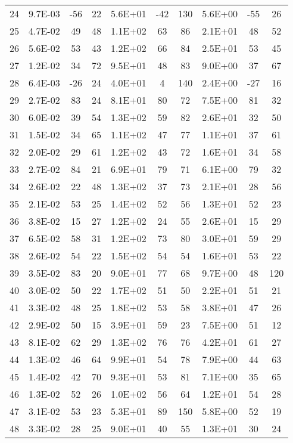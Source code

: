 \begin{tabular}{cccccccccc}
24 & 9.7E-03 & -56 & 22 & 5.6E+01 & -42 & 130 & 5.6E+00 & -55 & 26 \\
25 & 4.7E-02 & 49 & 48 & 1.1E+02 & 63 & 86 & 2.1E+01 & 48 & 52 \\
26 & 5.6E-02 & 53 & 43 & 1.2E+02 & 66 & 84 & 2.5E+01 & 53 & 45 \\
27 & 1.2E-02 & 34 & 72 & 9.5E+01 & 48 & 83 & 9.0E+00 & 37 & 67 \\
28 & 6.4E-03 & -26 & 24 & 4.0E+01 & 4 & 140 & 2.4E+00 & -27 & 16 \\
29 & 2.7E-02 & 83 & 24 & 8.1E+01 & 80 & 72 & 7.5E+00 & 81 & 32 \\
30 & 6.0E-02 & 39 & 54 & 1.3E+02 & 59 & 82 & 2.6E+01 & 32 & 50 \\
31 & 1.5E-02 & 34 & 65 & 1.1E+02 & 47 & 77 & 1.1E+01 & 37 & 61 \\
32 & 2.0E-02 & 29 & 61 & 1.2E+02 & 43 & 72 & 1.6E+01 & 34 & 58 \\
33 & 2.7E-02 & 84 & 21 & 6.9E+01 & 79 & 71 & 6.1E+00 & 79 & 32 \\
34 & 2.6E-02 & 22 & 48 & 1.3E+02 & 37 & 73 & 2.1E+01 & 28 & 56 \\
35 & 2.1E-02 & 53 & 25 & 1.4E+02 & 52 & 56 & 1.3E+01 & 52 & 23 \\
36 & 3.8E-02 & 15 & 27 & 1.2E+02 & 24 & 55 & 2.6E+01 & 15 & 29 \\
37 & 6.5E-02 & 58 & 31 & 1.2E+02 & 73 & 80 & 3.0E+01 & 59 & 29 \\
38 & 2.6E-02 & 54 & 22 & 1.5E+02 & 54 & 54 & 1.6E+01 & 53 & 22 \\
39 & 3.5E-02 & 83 & 20 & 9.0E+01 & 77 & 68 & 9.7E+00 & 48 & 120 \\
40 & 3.0E-02 & 50 & 22 & 1.7E+02 & 51 & 50 & 2.2E+01 & 51 & 21 \\
41 & 3.3E-02 & 48 & 25 & 1.8E+02 & 53 & 58 & 3.8E+01 & 47 & 26 \\
42 & 2.9E-02 & 50 & 15 & 3.9E+01 & 59 & 23 & 7.5E+00 & 51 & 12 \\
43 & 8.1E-02 & 62 & 29 & 1.3E+02 & 76 & 76 & 4.2E+01 & 61 & 27 \\
44 & 1.3E-02 & 46 & 64 & 9.9E+01 & 54 & 78 & 7.9E+00 & 44 & 63 \\
45 & 1.4E-02 & 42 & 70 & 9.3E+01 & 53 & 81 & 7.1E+00 & 35 & 65 \\
46 & 1.3E-02 & 52 & 26 & 1.0E+02 & 56 & 64 & 1.2E+01 & 54 & 28 \\
47 & 3.1E-02 & 53 & 23 & 5.3E+01 & 89 & 150 & 5.8E+00 & 52 & 19 \\
48 & 3.3E-02 & 28 & 25 & 9.0E+01 & 40 & 55 & 1.3E+01 & 30 & 24 \\

\end{tabular}
